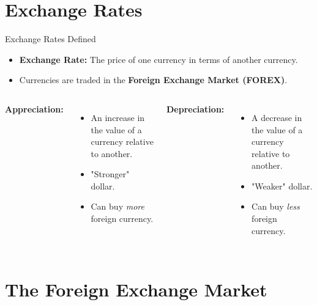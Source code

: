 \documentclass[aspectratio=169]{beamer}
\begin{document}
\section{Exchange Rates}

\begin{frame}{Exchange Rates Defined}
    \begin{itemize}
        \item \textbf{Exchange Rate:} The price of one currency in terms of another currency.
        \item Currencies are traded in the \textbf{Foreign Exchange Market (FOREX)}.
    \end{itemize}
    \vspace{0.5cm}
    \begin{columns}
        \textbf{Appreciation:}
        \begin{itemize}
            \item An increase in the value of a currency relative to another.
            \item "Stronger" dollar.
            \item Can buy \textit{more} foreign currency.
        \end{itemize}
        
        \textbf{Depreciation:}
        \begin{itemize}
            \item A decrease in the value of a currency relative to another.
            \item "Weaker" dollar.
            \item Can buy \textit{less} foreign currency.
        \end{itemize}
    \end{columns}
\end{frame}

\section{The Foreign Exchange Market}
\end{document}
